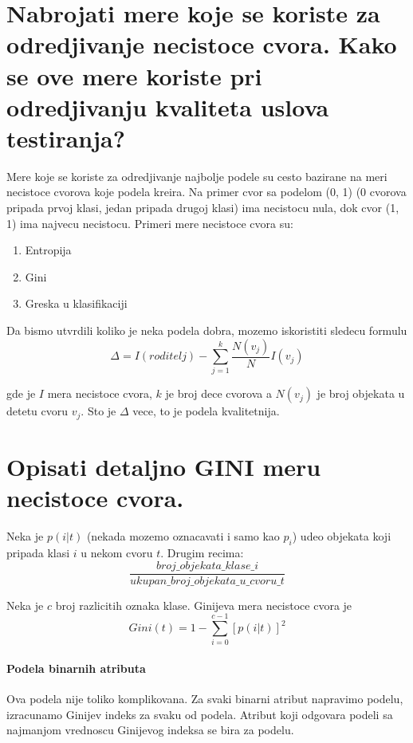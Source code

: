 \documentclass[a4paper]{article}
\begin{document}
\section{Nabrojati mere koje se koriste za odredjivanje necistoce cvora. Kako se ove mere koriste
pri odredjivanju kvaliteta uslova testiranja?}
Mere koje se koriste za odredjivanje najbolje podele su cesto bazirane na meri necistoce cvorova
koje podela kreira. Na primer cvor sa podelom (0, 1) (0 cvorova pripada prvoj klasi, jedan pripada
drugoj klasi) ima necistocu nula, dok cvor (1, 1) ima najvecu necistocu. Primeri mere necistoce
cvora su:
\begin{enumerate}
    \item Entropija
    \item Gini
    \item Greska u klasifikaciji
\end{enumerate}

Da bismo utvrdili koliko je neka podela dobra, mozemo iskoristiti sledecu formulu
\begin{equation}
    \label{eq:dobit}
    \Delta = I(roditelj) - \sum_{j=1}^{k} \dfrac{N(v_j)}{N}I(v_j)
\end{equation}

gde je \(I\) mera necistoce cvora, \(k\) je broj dece cvorova a \(N(v_j)\) je broj objekata u
detetu cvoru \(v_j\). Sto je \(\Delta\) vece, to je podela kvalitetnija.

\section{Opisati detaljno GINI meru necistoce cvora.}
Neka je \(p(i|t)\) (nekada mozemo oznacavati i samo kao \(p_i\)) udeo objekata koji pripada klasi
\(i\) u nekom cvoru \(t\). Drugim recima:
\[
    \dfrac{broj\_objekata\_klase\_i}{ukupan\_broj\_objekata\_u\_cvoru\_t}
\]

Neka je \(c\) broj razlicitih oznaka klase. Ginijeva mera necistoce cvora je
\begin{equation}\label{eq:gini}
    Gini(t) = 1 - \sum_{i=0}^{c-1} [p(i|t)]^2
\end{equation}

\paragraph{Podela binarnih atributa} Ova podela nije toliko komplikovana. Za svaki binarni atribut
napravimo podelu, izracunamo Ginijev indeks za svaku od podela. Atribut koji odgovara podeli sa
najmanjom vrednoscu Ginijevog indeksa se bira za podelu.
\end{document}
